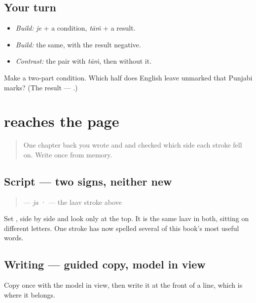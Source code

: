 \subsection*{Your turn}
\begin{itemize}
\raggedright
  \item \emph{Build:} \emph{je} + a condition, \emph{tāṁ} + a result.
  \item \emph{Build:} the same, with the result negative.
  \item \emph{Contrast:} the pair with \emph{tāṁ}, then without it.
\end{itemize}

\begin{tcolorbox}[breakable,colback=teal!4,colframe=teal!35!black,title={Before you move on}]
Make a two-part condition. Which half does English leave unmarked that Punjabi marks? (The result — \textbf{}.)
\end{tcolorbox}
\section[\texorpdfstring{\pa{ਜੇ} (je)}{ਜੇ (je)}]{ reaches the page}

\label{lesson:PA-C41-je-write}



\begin{quote}
One chapter back you wrote \textbf{} and \textbf{} and checked which side each stroke fell on. Write \textbf{} once from memory.
\end{quote}

\subsection*{Script — two signs, neither new}
\begin{quote}
\textbf{} — \emph{ja} · \textbf{} — the laav stroke above
\end{quote}

Set \textbf{}, \textbf{} side by side and look only at the top. It is the same laav in both, sitting on different letters. One stroke has now spelled several of this book's most useful words.

\subsection*{Writing — guided copy, model in view}
Copy \textbf{} once with the model in view, then write it at the front of a line, which is where it belongs.

